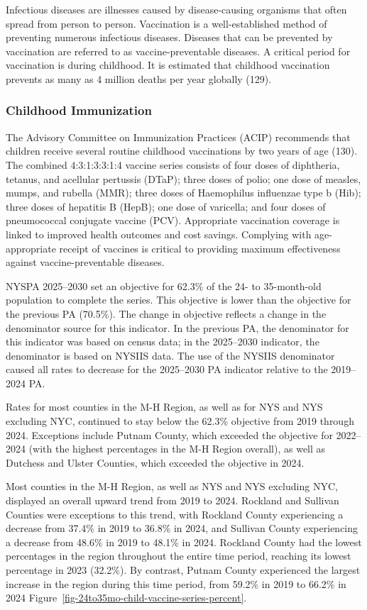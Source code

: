 \documentclass[
  english,
  letterpaper,
]{report}
\begin{document}
Infectious diseases are illnesses caused by disease-causing organisms
that often spread from person to person. Vaccination is a
well-established method of preventing numerous infectious diseases.
Diseases that can be prevented by vaccination are referred to as
vaccine-preventable diseases. A critical period for vaccination is
during childhood. It is estimated that childhood vaccination prevents as
many as 4 million deaths per year globally (129).

\subsubsection{Childhood Immunization}\label{childhood-immunization}

The Advisory Committee on Immunization Practices (ACIP) recommends that
children receive several routine childhood vaccinations by two years of
age (130). The combined 4:3:1:3:3:1:4 vaccine series consists of four
doses of diphtheria, tetanus, and acellular pertussis (DTaP); three
doses of polio; one dose of measles, mumps, and rubella (MMR); three
doses of Haemophilus influenzae type b (Hib); three doses of hepatitis B
(HepB); one dose of varicella; and four doses of pneumococcal conjugate
vaccine (PCV). Appropriate vaccination coverage is linked to improved
health outcomes and cost savings. Complying with age-appropriate receipt
of vaccines is critical to providing maximum effectiveness against
vaccine-preventable diseases.

NYSPA 2025--2030 set an objective for 62.3\% of the 24- to 35-month-old
population to complete the series. This objective is lower than the
objective for the previous PA (70.5\%). The change in objective reflects
a change in the denominator source for this indicator. In the previous
PA, the denominator for this indicator was based on census data; in the
2025--2030 indicator, the denominator is based on NYSIIS data. The use
of the NYSIIS denominator caused all rates to decrease for the
2025--2030 PA indicator relative to the 2019--2024 PA.

Rates for most counties in the M-H Region, as well as for NYS and NYS
excluding NYC, continued to stay below the 62.3\% objective from 2019
through 2024. Exceptions include Putnam County, which exceeded the
objective for 2022--2024 (with the highest percentages in the M-H Region
overall), as well as Dutchess and Ulster Counties, which exceeded the
objective in 2024.

Most counties in the M-H Region, as well as NYS and NYS excluding NYC,
displayed an overall upward trend from 2019 to 2024. Rockland and
Sullivan Counties were exceptions to this trend, with Rockland County
experiencing a decrease from 37.4\% in 2019 to 36.8\% in 2024, and
Sullivan County experiencing a decrease from 48.6\% in 2019 to 48.1\% in
2024. Rockland County had the lowest percentages in the region
throughout the entire time period, reaching its lowest percentage in
2023 (32.2\%). By contrast, Putnam County experienced the largest
increase in the region during this time period, from 59.2\% in 2019 to
66.2\% in 2024 Figure~\ref{fig-24to35mo-child-vaccine-series-percent}.
\end{document}
